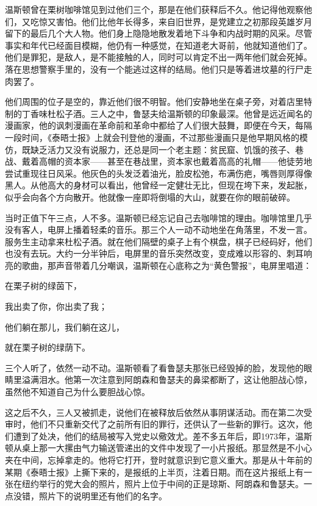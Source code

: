 温斯顿曾在栗树咖啡馆见到过他们三个，那是在他们获释后不久。他记得他观察他们，又吃惊又害怕。他们比他年长得多，来自旧世界，是党建立之初那段英雄岁月留下的最后几个大人物。他们身上隐隐地散发着地下斗争和内战时期的风采。尽管事实和年代已经面目模糊，他仍有一种感觉，在知道老大哥前，他就知道他们了。他们是罪犯，是敌人，是不能接触的人，同时可以肯定不出一两年他们就会死掉。落在思想警察手里的，没有一个能逃过这样的结局。他们只是等着进坟墓的行尸走肉罢了。

他们周围的位子是空的，靠近他们很不明智。他们安静地坐在桌子旁，对着店里特制的丁香味杜松子酒。三人之中，鲁瑟夫给温斯顿的印象最深。他曾是远近闻名的漫画家，他的讽刺漫画在革命前和革命中都给了人们很大鼓舞，即便在今天，每隔一段时间，《泰晤士报》上就会刊登他的漫画，不过那些漫画只是他早期风格的模仿，既缺乏活力又没有说服力，还总是同一个老主题：贫民窟、饥饿的孩子、巷战、戴着高帽的资本家------甚至在巷战里，资本家也戴着高高的礼帽------他徒劳地尝试重现往日风采。他灰色的头发泛着油光，脸皮松弛，布满伤疤，嘴唇则厚得像黑人。从他高大的身材可以看出，他曾经一定健壮无比，但现在垮下来，发起胀，似乎会向各个方向散开。他就像一座即将倒塌的大山，就要在你的眼前破碎。

当时正值下午三点，人不多。温斯顿已经忘记自己去咖啡馆的理由。咖啡馆里几乎没有客人，电屏上播着轻柔的音乐。那三个人一动不动地坐在角落里，不发一言。服务生主动拿来杜松子酒。就在他们隔壁的桌子上有个棋盘，棋子已经码好，他们也没有去玩。大约一分半钟后，电屏里的音乐突然改变，变成难以形容的、刺耳响亮的歌曲，那声音带着几分嘲讽，温斯顿在心底称之为``黄色警报''，电屏里唱道：

在栗子树的绿茵下，

我出卖了你，你出卖了我；

他们躺在那儿，我们躺在这儿，

就在栗子树的绿荫下。

三个人听了，依然一动不动。温斯顿看了看鲁瑟夫那张已经毁掉的脸，发现他的眼睛里溢满泪水。他第一次注意到阿朗森和鲁瑟夫的鼻梁都断了，这让他胆战心惊，虽然他不知道自己为什么要胆战心惊。

这之后不久，三人又被抓走，说他们在被释放后依然从事阴谋活动。而在第二次受审时，他们不只重新交代了之前所有旧的罪行，还供认了一些新的罪行。这次，他们遭到了处决，他们的结局被写入党史以儆效尤。差不多五年后，即1973年，温斯顿从桌上那一大摞由气力输送管递出的文件中发现了一小片报纸。那显然是不小心夹在中间，忘掉拿走的。他将它打开，登时就意识到它意义重大。那是从十年前的某期《泰晤士报》上撕下来的，是报纸的上半页，注着日期。而在这片报纸上有一张在纽约举行的党大会的照片，照片上位于中间的正是琼斯、阿朗森和鲁瑟夫。一点没错，照片下的说明里还有他们的名字。

